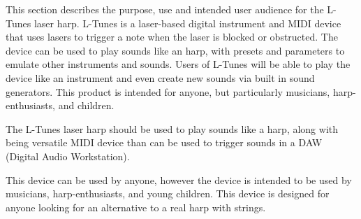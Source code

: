 This section describes the purpose, use and intended user audience for the L-Tunes laser harp. L-Tunes is a laser-based digital instrument and MIDI device that uses lasers to trigger a note when the laser is blocked or obstructed. The device can be used to play sounds like an harp, with presets and parameters to emulate other instruments and sounds.   Users of L-Tunes will be able to play the device like an instrument and even create new sounds via built in sound generators. This product is intended for anyone, but particularly musicians, harp-enthusiasts, and children.

The L-Tunes laser harp should be used to play sounds like a harp, along with being versatile MIDI device than can be used to trigger sounds in a DAW (Digital Audio Workstation).

This device can be used by anyone,  however the device is intended to be used by musicians,  harp-enthusiasts, and young children. This device is designed for anyone looking for an alternative to a real harp with strings. 
